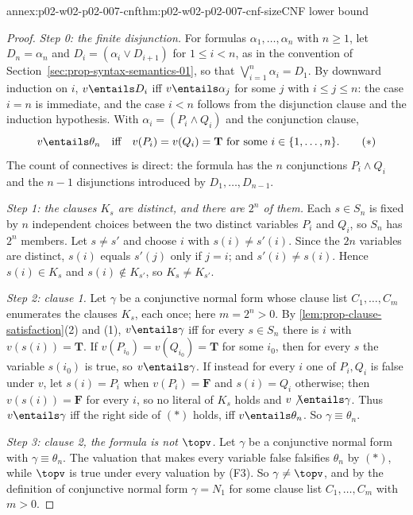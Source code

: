 \begin{annexitem}{annex:p02-w02-p02-007-cnf}{thm:p02-w02-p02-007-cnf-size}{CNF lower bound}
\begin{proof}
\emph{Step 0: the finite disjunction.}  For formulas
\(\alpha_1,\ldots,\alpha_n\) with \(n\geq1\), let \(D_n=\alpha_n\) and
\(D_i=(\alpha_i\lor D_{i+1})\) for \(1\leq i<n\), as in the convention of
Section~\ref{sec:prop-syntax-semantics-01}, so that
\(\bigvee_{i=1}^{n}\alpha_i=D_1\).  By downward induction on \(i\),
\(v\entails D_i\) iff \(v\entails\alpha_j\) for some \(j\) with
\(i\leq j\leq n\): the case \(i=n\) is immediate, and the case \(i<n\)
follows from the disjunction clause and the induction hypothesis.  With
\(\alpha_i=(P_i\land Q_i)\) and the conjunction clause,
\[
 v\entails\theta_n
 \quad\text{iff}\quad
 v(P_i)=v(Q_i)=\mathbf T\text{ for some }i\in\{1,\ldots,n\}.
 \tag{\(\ast\)}
\]
The count of connectives is direct: the formula has the \(n\) conjunctions
\(P_i\land Q_i\) and the \(n-1\) disjunctions introduced by
\(D_1,\ldots,D_{n-1}\).

\emph{Step 1: the clauses \(K_s\) are distinct, and there are \(2^n\) of
them.}  Each \(s\in S_n\) is fixed by \(n\) independent choices between
the two distinct variables \(P_i\) and \(Q_i\), so \(S_n\) has \(2^n\)
members.  Let \(s\neq s'\) and choose \(i\) with \(s(i)\neq s'(i)\).
Since the \(2n\) variables are distinct, \(s(i)\) equals \(s'(j)\) only if
\(j=i\); and \(s'(i)\neq s(i)\).  Hence \(s(i)\in K_s\) and
\(s(i)\notin K_{s'}\), so \(K_s\neq K_{s'}\).

\emph{Step 2: clause 1.}  Let \(\gamma\) be a conjunctive normal form whose
clause list \(C_1,\ldots,C_m\) enumerates the clauses \(K_s\), each once;
here \(m=2^n>0\).  By \cref{lem:prop-clause-satisfaction}(2) and (1),
\(v\entails\gamma\) iff for every \(s\in S_n\) there is \(i\) with
\(v(s(i))=\mathbf T\).  If \(v(P_{i_0})=v(Q_{i_0})=\mathbf T\) for some
\(i_0\), then for every \(s\) the variable \(s(i_0)\) is true, so
\(v\entails\gamma\).  If instead for every \(i\) one of \(P_i,Q_i\) is false
under \(v\), let \(s(i)=P_i\) when \(v(P_i)=\mathbf F\) and \(s(i)=Q_i\)
otherwise; then \(v(s(i))=\mathbf F\) for every \(i\), so no literal of
\(K_s\) holds and \(v\not\entails\gamma\).  Thus \(v\entails\gamma\) iff the
right side of \((\ast)\) holds, iff \(v\entails\theta_n\).  So
\(\gamma\equiv\theta_n\).

\emph{Step 3: clause 2, the formula is not \(\topv\).}  Let \(\gamma\) be a
conjunctive normal form with \(\gamma\equiv\theta_n\).  The valuation that
makes every variable false falsifies \(\theta_n\) by \((\ast)\), while
\(\topv\) is true under every valuation by (F3).  So \(\gamma\neq\topv\),
and by the definition of conjunctive normal form \(\gamma=N_1\) for some
clause list \(C_1,\ldots,C_m\) with \(m>0\).


\end{proof}
\end{annexitem}
